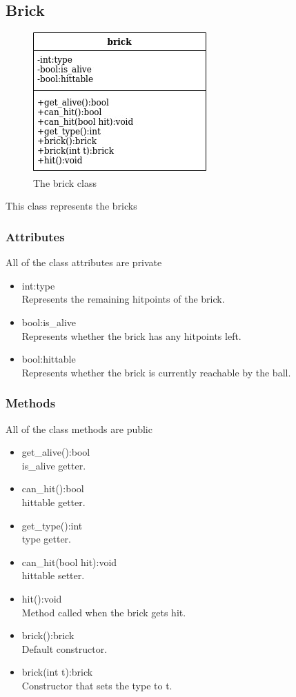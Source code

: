 \documentclass[]{article}
\begin{document}
\subsection{Brick}
\begin{figure}[h!]
    \centering
    \includegraphics[scale=0.5]{brick.jpg}
    \caption{The brick class}
    \label{fig:brick class diagram }
\end{figure}
This class represents the bricks
\subsubsection{Attributes}
All of the class attributes are private
\begin{itemize}
	\item int:type\\Represents the remaining hitpoints of the brick.
	\item bool:is\_alive\\Represents whether the brick has any hitpoints left.
	\item bool:hittable\\Represents whether the brick is currently reachable by the ball. 
\end{itemize}
\subsubsection{Methods}
All of the class methods are public
\begin{itemize}
	\item get\_alive():bool\\ is\_alive getter.
	\item can\_hit():bool\\hittable getter.
	\item get\_type():int\\ type getter.
	\item can\_hit(bool hit):void\\hittable setter.
	\item hit():void\\ Method called when the brick gets hit.
	\item brick():brick\\Default constructor.
	\item brick(int t):brick\\Constructor that sets the type to t.
\end{itemize}
\end{document}
